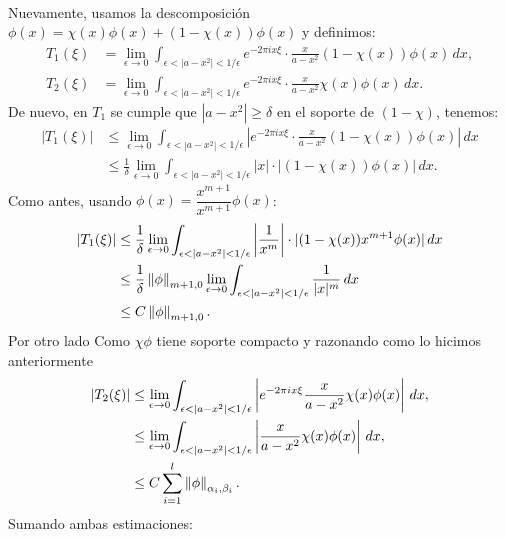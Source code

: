 \begin{homeworkProblem}
\begin{solution}
\begin{itemize}
\begin{align*}
        \end{align*}
        Nuevamente, usamos la descomposición $\phi(x) = \chi(x)\phi(x) + (1 - \chi(x))\phi(x)$ y definimos:
        \begin{align*}
          T_1(\xi) &= \lim_{\epsilon \to 0} \int_{\epsilon < |a - x^2| < 1/\epsilon} e^{-2\pi i x \xi} \cdot \frac{x}{a - x^2} (1 - \chi(x)) \phi(x) \, dx,\\
          T_2(\xi) &= \lim_{\epsilon \to 0} \int_{\epsilon < |a - x^2| < 1/\epsilon} e^{-2\pi i x \xi} \cdot \frac{x}{a - x^2} \chi(x) \phi(x) \, dx.
        \end{align*}
        De nuevo, en $T_{1}$ se cumple que $|a - x^2| \geq \delta$ en el soporte de $(1 - \chi)$, tenemos:
        \begin{align*}
          |T_1(\xi)| &\leq \lim_{\epsilon \to 0} \int_{\epsilon < |a - x^2| < 1/\epsilon} \left| e^{-2\pi i x \xi} \cdot \frac{x}{a - x^2} (1 - \chi(x)) \phi(x) \right| \, dx \\
          &\leq \frac{1}{\delta} \lim_{\epsilon \to 0} \int_{\epsilon < |a - x^2| < 1/\epsilon} |x| \cdot |(1 - \chi(x)) \phi(x)| \, dx.
        \end{align*}
        Como antes, usando $\phi(x) = \dfrac{x^{m+1}}{x^{m+1}} \phi(x)$:
        \begin{align*}
          |T_1(\xi)| &\leq \frac{1}{\delta} \lim_{\epsilon \to 0} \int_{\epsilon < |a - x^2| < 1/\epsilon} \left| \frac{1}{x^m} \right| \cdot |(1 - \chi(x)) x^{m+1} \phi(x)| \, dx \\
          &\leq \frac{1}{\delta} \left\|\phi\right\|_{m+1,0} \lim_{\epsilon \to 0} \int_{\epsilon < |a - x^2| < 1/\epsilon} \frac{1}{|x|^m} \, dx \\
          &\leq C \left\|\phi\right\|_{m+1,0}.
        \end{align*}
        Por otro lado Como $\chi \phi$ tiene soporte compacto y razonando como lo hicimos anteriormente
        \begin{align*} 
          |T_2(\xi)| &\leq \lim_{\epsilon \to 0} \int_{\epsilon < |a - x^2| < 1/\epsilon} \left|e^{-2\pi i x \xi} \frac{x}{a - x^2} \chi(x) \phi(x)\right| \, dx,\\
          &\leq\lim_{\epsilon \to 0} \int_{\epsilon < |a - x^2| < 1/\epsilon} \left| \frac{x}{a - x^2} \chi(x) \phi(x)\right| \, dx,\\
          &\leq C\sum_{i=1}^{l}\left\|\phi\right\|_{\alpha_{i},\beta_{i}}.
        \end{align*}
        Sumando ambas estimaciones:
        \begin{align*}

\end{align*}
\end{itemize}
\end{solution}
\end{homeworkProblem}
